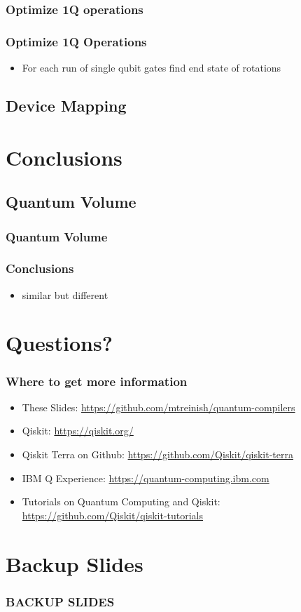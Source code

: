 \documentclass[aspectratio=169,11pt,hyperref={colorlinks=true}]{beamer}
\begin{document}
\subsubsection{Optimize 1Q operations}
\begin{frame}
    \frametitle{Optimize 1Q Operations}
    \begin{itemize}
        \item For each run of single qubit gates find end state of rotations
    \end{itemize}
\end{frame}

\subsection{Device Mapping}

\section{Conclusions}
\subsection{Quantum Volume}
\begin{frame}
    \frametitle{Quantum Volume\footnotemark[1]}

    \vspace{3em}
\end{frame}
\begin{frame}
    \frametitle{Conclusions}
    \begin{itemize}
        \item similar but different
    \end{itemize}
\end{frame}

\section{Questions?}
\begin{frame}
\frametitle{Where to get more information}
    \begin{itemize}
        \item These Slides: \href{https://github.com/mtreinish/quantum-compilers}{https://github.com/mtreinish/quantum-compilers}
        \item Qiskit: \href{https://qiskit.org/}{https://qiskit.org/}
        \item Qiskit Terra on Github: \href{https://github.com/Qiskit/qiskit-terra}{https://github.com/Qiskit/qiskit-terra}
        \item IBM Q Experience: \href{https://quantum-computing.ibm.com}{https://quantum-computing.ibm.com}
        \item Tutorials on Quantum Computing and Qiskit: \href{https://github.com/Qiskit/qiskit-tutorials}{https://github.com/Qiskit/qiskit-tutorials}
    \end{itemize}
\end{frame}

\section{Backup Slides}
\begin{frame}[noframenumbering]
    \frametitle{BACKUP SLIDES}
\end{frame}
\end{document}
